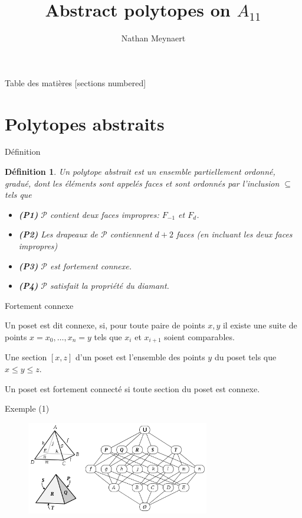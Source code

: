 \documentclass[10pt]{beamer}
\title{Abstract polytopes on $A_{11}$}
\date{}
\author{Nathan Meynaert}
\newtheorem{definition}{Définition}[section]
\begin{document}
\maketitle

\begin{frame}{Table des matières}
  [sections numbered]
  \tableofcontents[hideallsubsections]
\end{frame}

\section{Polytopes abstraits}

\begin{frame}{Définition}

  \begin{definition}
    Un \textit{polytope abstrait} est un ensemble partiellement ordonné, gradué,  dont les éléments sont appelés \textit{faces} et sont ordonnés par l'inclusion $\subseteq$ tels que
    \begin{itemize}
      \item \textbf{(P1)} $\mathcal P$ contient deux faces impropres: $F_{-1}$ et $F_d$.
      \item \textbf{(P2)} Les drapeaux de $\mathcal P$ contiennent $d+2$ faces (en incluant les deux faces impropres)    \item \textbf{(P3)} $\mathcal P$ est fortement connexe.
      \item \textbf{(P4)} $\mathcal P$ satisfait la propriété du diamant.
    \end{itemize}
  \end{definition}

\end{frame}

\begin{frame}{Fortement connexe}

  Un poset est dit connexe, si, pour toute paire de points $x, y$ il existe une suite de points $x = x_0, \dots, x_n = y$ tels que $x_i$ et $x_{i+1}$ soient comparables.

  Une section $[x,z]$ d'un poset est l'ensemble des points $y$ du poset tels que  $x \le y \le z$.

  Un poset est fortement connecté si toute section du poset est connexe.

\end{frame}

\begin{frame}{Exemple (1)}
  \begin{figure}[H]
    \begin{center}
      \includegraphics[width=8cm]{Pyramid.png}
    \end{center}
  \end{figure}
\end{frame}
\end{document}

